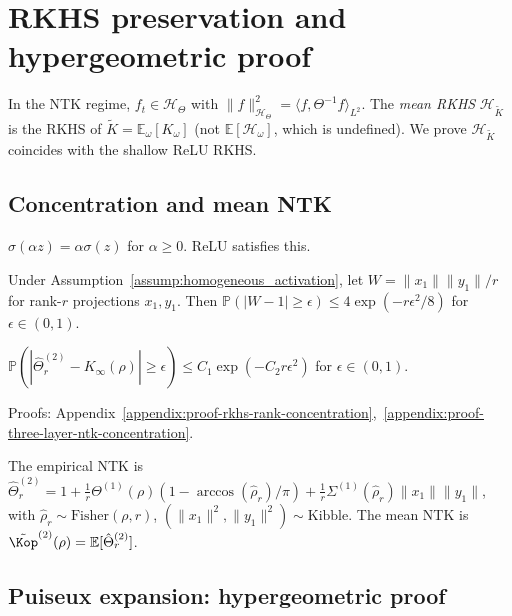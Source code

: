 \section{RKHS preservation and hypergeometric proof}\label{sec:no-rkhs-advantage}

In the NTK regime, \( f_t \in \mathcal{H}_\Theta \) with \( \|f\|_{\mathcal{H}_\Theta}^2 = \langle f, \Theta^{-1} f \rangle_{L^2} \). The \emph{mean RKHS} \( \mathcal{H}_{\tilde{K}} \) is the RKHS of \( \tilde{K} = \mathbb{E}_\omega[K_\omega] \) (not \( \mathbb{E}[\mathcal{H}_\omega] \), which is undefined). We prove \( \mathcal{H}_{\tilde{K}} \) coincides with the shallow ReLU RKHS.

\subsection{Concentration and mean NTK}

\begin{assumption}\label{assump:homogeneous_activation}
\( \sigma(\alpha z) = \alpha \sigma(z) \) for \( \alpha \ge 0 \). ReLU satisfies this.
\end{assumption}

\begin{theorem}\label{thm:rkhs_rank_concentration}
Under Assumption~\ref{assump:homogeneous_activation}, let \( W = \|x_1\|\|y_1\|/r \) for rank-\( r \) projections \( x_1, y_1 \). Then \( \mathbb{P}(|W-1| \ge \epsilon) \le 4\exp(-r\epsilon^2/8) \) for \( \epsilon \in (0,1) \).
\end{theorem}

\begin{corollary}\label{cor:two_layer_ntk_concentration}
\( \mathbb{P}(|\hat{\Theta}^{(2)}_r - K_\infty(\rho)| \ge \epsilon) \le C_1 \exp(-C_2 r\epsilon^2) \) for \( \epsilon \in (0,1) \).
\end{corollary}
Proofs: Appendix~\ref{appendix:proof-rkhs-rank-concentration},~\ref{appendix:proof-three-layer-ntk-concentration}.

The empirical NTK is \( \hat{\Theta}^{(2)}_r = 1 + \frac{1}{r}\Theta^{(1)}(\rho)(1-\arccos(\hat{\rho}_r)/\pi) + \frac{1}{r}\Sigma^{(1)}(\hat{\rho}_r)\|x_1\|\|y_1\| \), with \( \hat{\rho}_r \sim \text{Fisher}(\rho,r) \), \( (\|x_1\|^2,\|y_1\|^2) \sim \text{Kibble} \). The mean NTK is \( \tilde{\Kop}^{(2)}(\rho) = \mathbb{E}[\hat{\Theta}^{(2)}_r] \).

\subsection{Puiseux expansion: hypergeometric proof}

